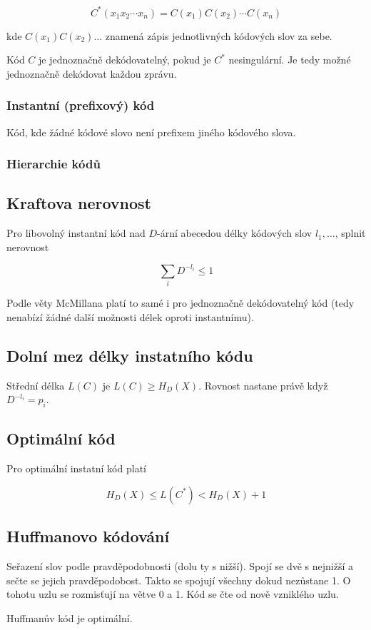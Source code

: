 $$
    C^*(x_1x_2\cdots x_n) = C(x_1)C(x_2)\cdots C(x_n)
$$

kde $C(x_1)C(x_2)\dots$ znamená zápis jednotlivných kódových slov za sebe.

Kód $C$ je jednoznačně dekódovatelný, pokud je $C^*$ nesingulární.
Je tedy možné jednoznačně dekódovat každou zprávu.

\subsubsection*{Instantní (prefixový) kód}

Kód, kde žádné kódové slovo není prefixem jiného kódového slova.

\subsubsection*{Hierarchie kódů}


\subsection{Kraftova nerovnost}

Pro libovolný instantní kód nad $D$-ární abecedou délky kódových slov $l_1,\dots$, splnit nerovnost

$$
    \sum_{i}{D^{-l_i} \leq 1}
$$

Podle věty McMillana platí to samé i pro jednoznačně dekódovatelný kód (tedy nenabízí žádné další možnosti délek oproti instantnímu).

\subsection{Dolní mez délky instatního kódu}

Střední délka $L(C)$ je $L(C) \geq H_D(X)$.
Rovnost nastane právě když $D^{-l_i} = p_i$.

\subsection{Optimální kód}

Pro optimální instatní kód platí

$$
    H_D(X) \leq L(C^*) < H_D(X) + 1
$$

\subsection{Huffmanovo kódování}

Seřazení slov podle pravděpodobnosti (dolu ty s nižší).
Spojí se dvě s nejnižší a sečte se jejich pravděpodobost.
Takto se spojují všechny dokud nezůstane 1.
O tohotu uzlu se rozmisťují na větve 0 a 1.
Kód se čte od nově vzniklého uzlu.

Huffmanův kód je optimální.
